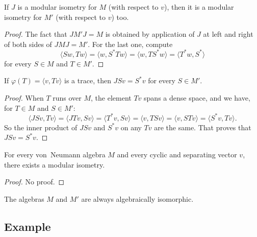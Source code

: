 \begin{proposition}
	If $J$ is a modular isometry for $M$ (with respect to $v$), then it is a modular isometry for $M'$ (with respect to $v$) too.
\end{proposition}

\begin{proof}
	The fact that $JM'J=M$ is obtained by application of $J$ at left and right of both sides of $JMJ=M'$. For the last one, compute
	\begin{equation}
		\langle Sw, Tw\rangle =\langle w, S^*Tw\rangle =\langle w, TS^*w\rangle =\langle T^*w, S^*\rangle
	\end{equation}
	for every $S\in M$ and $T\in M'$.
\end{proof}

\begin{proposition}
	If $\varphi(T)=\langle v, Tv\rangle $ is a trace, then $JSv=S^*v$ for every $S\in M'$.
\end{proposition}

\begin{proof}
	When $T$ runs over $M$, the element $Tv$ spans a dense space, and we have, for $T\in M$ and $S\in M'$:
	\begin{equation}
		\langle JSv, Tv\rangle =\langle JTv, Sv\rangle =\langle T^*v, Sv\rangle =\langle v, TSv\rangle =\langle v, STv\rangle =\langle S^*v, Tv\rangle .
	\end{equation}
	So the inner product of $JSv$ and $S^*v$ on any $Tv$ are the same. That proves that $JSv=S^*v$.
\end{proof}

\begin{theorem}
	For every von~Neumann algebra $M$ and every cyclic and separating vector $v$, there exists a modular isometry.
\end{theorem}

\begin{proof}
	No proof.
\end{proof}

\begin{corollary}
	The algebras $M$ and $M'$ are always algebraically isomorphic.
\end{corollary}

\subsection{Example}

